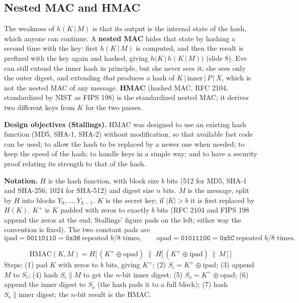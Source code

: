 \subsection{Nested MAC and HMAC \hot\new}

The weakness of $h(K \,|\, M)$ is that its output is the internal state of the hash, which anyone can continue. A \textbf{nested MAC} hides that state by hashing a second time with the key: first $h(K \,|\, M)$ is computed, and then the result is prefixed with the key again and hashed, giving $h\big(K \,|\, h(K \,|\, M)\big)$ (slide 8). Eve can still extend the inner hash in principle, but she never sees it; she sees only the outer digest, and extending \emph{that} produces a hash of $K \,|\, \text{inner} \,|\, P \,|\, X$, which is not the nested MAC of any message. \textbf{HMAC} (hashed MAC, RFC 2104, standardized by NIST as FIPS 198) is the standardized nested MAC; it derives two different keys from $K$ for the two passes.

\textbf{Design objectives (Stallings).} HMAC was designed to use an existing hash function (MD5, SHA-1, SHA-2) without modification, so that available fast code can be used; to allow the hash to be replaced by a newer one when needed; to keep the speed of the hash; to handle keys in a simple way; and to have a security proof relating its strength to that of the hash.

\textbf{Notation.} $H$ is the hash function, with block size $b$ bits (512 for MD5, SHA-1 and SHA-256; 1024 for SHA-512) and digest size $n$ bits. $M$ is the message, split by $H$ into blocks $Y_0, \dots, Y_{L-1}$. $K$ is the secret key; if $|K| > b$ it is first replaced by $H(K)$. $K^+$ is $K$ padded with zeros to exactly $b$ bits (RFC 2104 and FIPS 198 append the zeros at the end; Stallings' figure pads on the left; either way the convention is fixed). The two constant pads are
\[
\mathrm{ipad} = \texttt{00110110} = \texttt{0x36}\ \text{repeated } b/8 \text{ times}, \qquad \mathrm{opad} = \texttt{01011100} = \texttt{0x5C}\ \text{repeated } b/8 \text{ times}.
\]

\begin{mustknow}
\[
\mathrm{HMAC}(K, M) = H\Big[\, (K^+ \oplus \mathrm{opad}) \;\big\|\; H\big[\, (K^+ \oplus \mathrm{ipad}) \,\|\, M \,\big] \,\Big]
\]
Steps: (1) pad $K$ with zeros to $b$ bits, giving $K^+$; (2) $S_i = K^+ \oplus \mathrm{ipad}$; (3) append $M$ to $S_i$; (4) hash $S_i \| M$ to get the $n$-bit inner digest; (5) $S_o = K^+ \oplus \mathrm{opad}$; (6) append the inner digest to $S_o$ (the hash pads it to a full block); (7) hash $S_o \| \text{inner digest}$; the $n$-bit result is the HMAC.
\end{mustknow}

